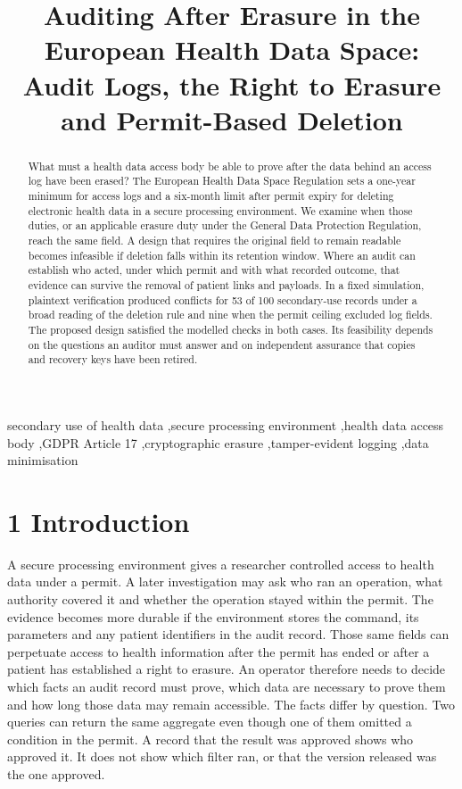 \documentclass[5p,twocolumn]{elsarticle}
\begin{document}
\begin{frontmatter}
\title{Auditing After Erasure in the European Health Data Space: Audit
Logs, the Right to Erasure and Permit-Based Deletion}
\begin{abstract}
What must a health data access body be able to prove after the data
behind an access log have been erased? The European Health Data Space
Regulation sets a one-year minimum for access logs and a six-month limit
after permit expiry for deleting electronic health data in a secure
processing environment. We examine when those duties, or an applicable
erasure duty under the General Data Protection Regulation, reach the
same field. A design that requires the original field to remain readable
becomes infeasible if deletion falls within its retention window. Where
an audit can establish who acted, under which permit and with what
recorded outcome, that evidence can survive the removal of patient links
and payloads. In a fixed simulation, plaintext verification produced
conflicts for 53 of 100 secondary-use records under a broad reading of
the deletion rule and nine when the permit ceiling excluded log fields.
The proposed design satisfied the modelled checks in both cases. Its
feasibility depends on the questions an auditor must answer and on
independent assurance that copies and recovery keys have been retired.
\end{abstract}
\begin{keyword}
secondary use of health data \sep secure processing
environment \sep health data access body \sep GDPR Article
17 \sep cryptographic erasure \sep tamper-evident logging \sep data
minimisation
\end{keyword}
\end{frontmatter}
\hypertarget{introduction}{%
\section{1 Introduction}\label{introduction}}

A secure processing environment gives a researcher controlled access to
health data under a permit. A later investigation may ask who ran an
operation, what authority covered it and whether the operation stayed
within the permit. The evidence becomes more durable if the environment
stores the command, its parameters and any patient identifiers in the
audit record. Those same fields can perpetuate access to health
information after the permit has ended or after a patient has
established a right to erasure. An operator therefore needs to decide
which facts an audit record must prove, which data are necessary to
prove them and how long those data may remain accessible. The facts
differ by question. Two queries can return the same aggregate even
though one of them omitted a condition in the permit. A record that the
result was approved shows who approved it. It does not show which filter
ran, or that the version released was the one approved.
\end{document}
